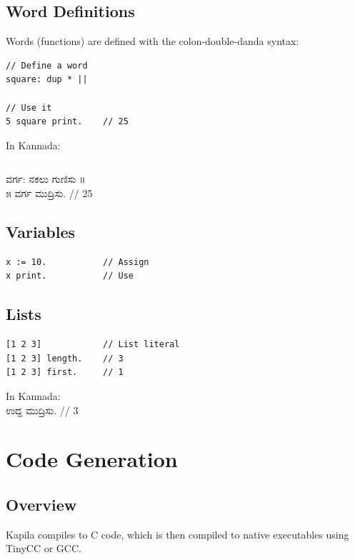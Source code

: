 \documentclass[11pt,a4paper]{report}
\newcommand{\kannada}[1]{{\kannadafont #1}}
\begin{document}
\section{Word Definitions}

Words (functions) are defined with the colon-double-danda syntax:

\begin{lstlisting}
// Define a word
square: dup * ||

// Use it
5 square print.    // 25
\end{lstlisting}

In Kannada:
\begin{verbatim}
\end{verbatim}
\kannada{ವರ್ಗ: ನಕಲು ಗುಣಿಸು ॥}\\
\kannada{೫ ವರ್ಗ ಮುದ್ರಿಸು.} \quad // 25

\section{Variables}

\begin{lstlisting}
x := 10.           // Assign
x print.           // Use
\end{lstlisting}

\section{Lists}

\begin{lstlisting}
[1 2 3]            // List literal
[1 2 3] length.    // 3
[1 2 3] first.     // 1
\end{lstlisting}

In Kannada:\\
\kannada{[೧ ೨ ೩] ಉದ್ದ ಮುದ್ರಿಸು.} \quad // 3

\chapter{Code Generation}

\section{Overview}

Kapila compiles to C code, which is then compiled to native executables using TinyCC or GCC.
\end{document}
